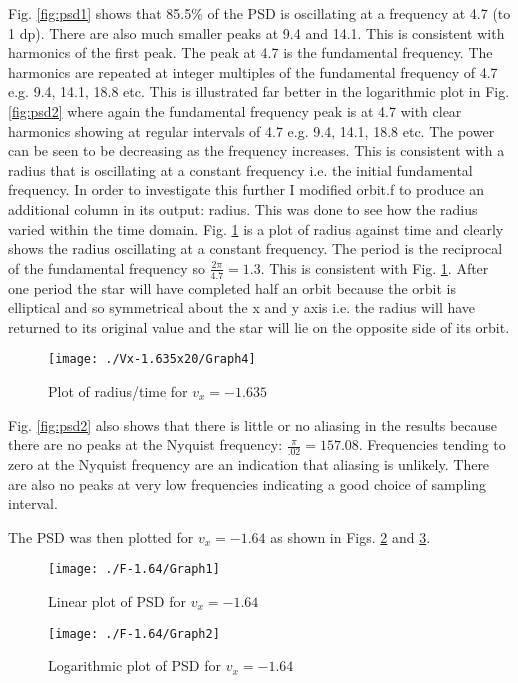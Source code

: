 \documentclass[a4paper,12pt]{article}
\begin{document}
Fig. \ref{fig:psd1} shows that 85.5\% of the PSD is oscillating at a frequency at 4.7 (to 1 dp). There are also much smaller peaks at 9.4 and 14.1. This is consistent with harmonics of the first peak. The peak at 4.7 is the fundamental frequency. The harmonics are repeated at integer multiples of the fundamental frequency of 4.7 e.g. 9.4, 14.1, 18.8 etc. This is illustrated far better in the logarithmic plot in Fig. \ref{fig:psd2} where again the fundamental frequency peak is at 4.7 with clear harmonics showing at regular intervals of 4.7 e.g. 9.4, 14.1, 18.8 etc. The power can be seen to be decreasing as the frequency increases. This is consistent with a radius that is oscillating at a constant frequency i.e. the initial fundamental frequency. In order to investigate this further I modified orbit.f to produce an additional column in its output: radius. This was done to see how the radius varied within the time domain. Fig. \ref{fig:radius1} is a plot of radius against time and clearly shows the radius oscillating at a constant frequency. The period is the reciprocal of the fundamental frequency so $\frac{2\pi}{4.7}=1.3$. This is consistent with Fig. \ref{fig:radius1}. After one period the star will have completed half an orbit because the orbit is elliptical and so symmetrical about the x and y axis i.e. the radius will have returned to its original value and the star will lie on the opposite side of its orbit.

\begin{figure}[H]
\centering
\texttt{[image: ./Vx-1.635x20/Graph4]}
\caption{Plot of radius/time for $v_x=-1.635$}
\label{fig:radius1}
\end{figure}

Fig. \ref{fig:psd2} also shows that there is little or no aliasing in the results because there are no peaks at the Nyquist frequency: $\frac{\pi}{.02}=157.08$. Frequencies tending to zero at the Nyquist frequency are an indication that aliasing is unlikely. There are also no peaks at very low frequencies indicating a good choice of sampling interval.

The PSD was then plotted for $v_x=-1.64$ as shown in Figs. \ref{fig:psd3} and \ref{fig:psd4}. 

\begin{figure}[H]
\centering
\texttt{[image: ./F-1.64/Graph1]}
\caption{Linear plot of PSD for $v_x=-1.64$}
\label{fig:psd3}
\end{figure}

\begin{figure}[H]
\centering
\texttt{[image: ./F-1.64/Graph2]}
\caption{Logarithmic plot of PSD for $v_x=-1.64$}
\label{fig:psd4}
\end{figure}
\end{document}
